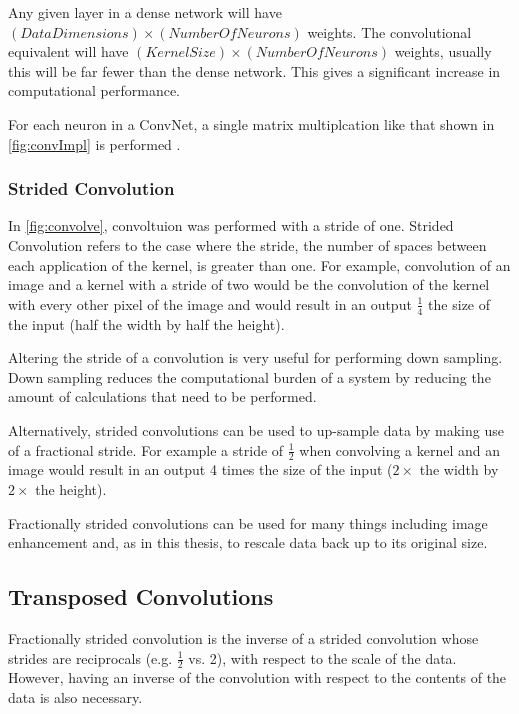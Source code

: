 Any given layer in a dense network will have $(Data Dimensions) \times (Number Of Neurons)$ weights. The convolutional equivalent will have $(Kernel Size) \times (Number Of Neurons)$ weights, usually this will be far fewer than the dense network. This gives a significant increase in computational performance.

For each neuron in a \ac{ConvNet}, a single matrix multiplcation like that shown in \autoref{fig:convImpl} is performed .

\subsubsection{Strided Convolution}
In \autoref{fig:convolve}, convoltuion was performed with a stride of one. Strided Convolution refers to the case where the stride, the number of spaces between each application of the kernel, is greater than one. For example, convolution of an image and a kernel with a stride of two would be the convolution of the kernel with every other pixel of the image and would result in an output $\frac{1}{4}$ the size of the input (half the width by half the height).

Altering the stride of a convolution is very useful for performing down sampling. Down sampling reduces the computational burden of a system by reducing the amount of calculations that need to be performed.

Alternatively, strided convolutions can be used to up-sample data by making use of a fractional stride. For example a stride of $\frac{1}{2}$ when convolving a kernel and an image would result in an output 4 times the size of the input ($2\times$ the width by $2\times$ the height).

Fractionally strided convolutions can be used for many things including image enhancement \cite{radford2015unsupervised} and, as in this thesis, to rescale data back up to its original size.

\subsection{Transposed Convolutions}
Fractionally strided convolution is the inverse of a strided convolution whose strides are reciprocals (e.g. $\frac{1}{2}$ vs. 2), with respect to the scale of the data. However, having an inverse of the convolution with respect to the contents of the data is also necessary.

